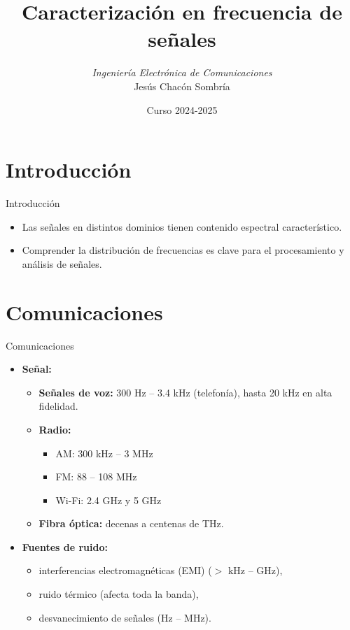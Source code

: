 \documentclass{beamer}
\title[Procesamiento de Señales]{Caracterización en frecuencia de señales}
\author[J. Chacón]{%
\textit{Ingeniería Electrónica de Comunicaciones }\\
\vspace{0.6cm}
\small Jesús Chacón Sombría}
\institute[DACYA] %
{

\footnotesize  Departamento de Arquitectura de Computadores y Automática.\\
  Universidad Complutense de Madrid
  }
\date[Transformada Fourier Discreta] %
{\footnotesize Curso 2024-2025}%
\numberwithin{section}{part}
\begin{document}
\frame{\titlepage}

\section{Introducción}
\begin{frame}{Introducción}
    \begin{itemize}
        \item Las señales en distintos dominios tienen contenido espectral característico.
        \item Comprender la distribución de frecuencias es clave para el procesamiento y análisis de señales.
    \end{itemize}
\end{frame}

\section{Comunicaciones}
\begin{frame}{Comunicaciones}
    \begin{itemize}
        \item \textbf{Señal:}
        \begin{itemize}
            \item \textbf{Señales de voz:} 300 Hz – 3.4 kHz (telefonía), hasta 20 kHz en alta fidelidad.
            \item \textbf{Radio:}
            \begin{itemize}
                \item AM: 300 kHz – 3 MHz
                \item FM: 88 – 108 MHz
                \item Wi-Fi: 2.4 GHz y 5 GHz
            \end{itemize}
            \item \textbf{Fibra óptica:} decenas a centenas de THz.
        \end{itemize}
        \item \textbf{Fuentes de ruido:}
        \begin{itemize}
            \item interferencias electromagnéticas (EMI) ($>$ kHz – GHz),
            \item ruido térmico (afecta toda la banda),
            \item desvanecimiento de señales (Hz – MHz).
        \end{itemize}
    \end{itemize}
\end{frame}
\end{document}

